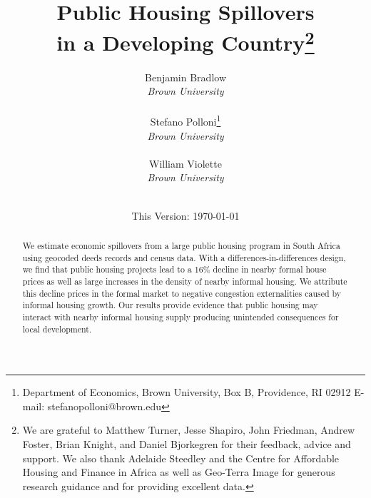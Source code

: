 \documentclass[12pt]{article}
\begin{document}
\begin{titlepage}
\title{Public Housing Spillovers \\ in a Developing Country\thanks{We are grateful to Matthew Turner, Jesse Shapiro, John Friedman, Andrew Foster, Brian Knight, and Daniel Bjorkegren for their feedback, advice and support.  We also thank Adelaide Steedley and the Centre for Affordable Housing and Finance in Africa as well as Geo-Terra Image for generous research guidance and for providing excellent data.}}
\vspace{2mm}
\author{Benjamin Bradlow\\[-0.4em] \normalsize{\it Brown University}\\
 \\ 
 Stefano Polloni\thanks{Department of Economics, Brown University, Box B, Providence, RI 02912  E-mail: stefano\textunderscore polloni@brown.edu}\\[-0.4em] \normalsize{\it Brown University}\\ 
 \\
  William Violette \\[-0.4em] \normalsize{\it Brown University}\\
 \\ 
  }
\vspace{30mm}
\date{\vspace{5mm}This Version: \today}
\maketitle
\begin{abstract}
 We estimate economic spillovers from a large public housing program in South Africa using geocoded deeds records and census data.  With a differences-in-differences design, we find that public housing projects lead to a 16\% decline in nearby formal house prices as well as large increases in the density of nearby informal housing.  We attribute this decline prices in the formal market to negative congestion externalities caused by informal housing growth.  Our results provide evidence that public housing may interact with nearby informal housing supply producing unintended consequences for local development.
\bigskip
\end{abstract}
\setcounter{page}{0}
\thispagestyle{empty}
\end{titlepage}
\pagebreak \newpage
\end{document}
